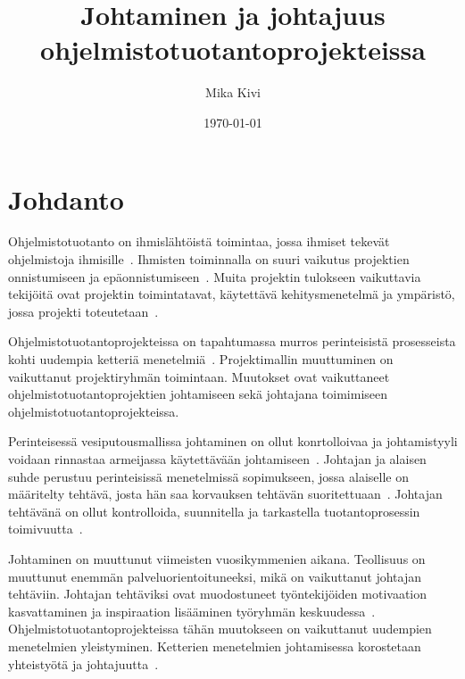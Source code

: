 \documentclass[finnish]{tktltiki2}
\title{Johtaminen ja johtajuus ohjelmistotuotantoprojekteissa}
\author{Mika Kivi}
\date{\today}
\theoremstyle{definition}
\theoremstyle{remark}
\begin{document}

\maketitle        %
\makeabstract     %

\tableofcontents  %
\thispagestyle{empty}
\newpage          %



\setcounter{page}{1}
\section{Johdanto}


Ohjelmistotuotanto on ihmislähtöistä toimintaa, jossa ihmiset tekevät ohjelmistoja ihmisille~\cite{Wang:2010:PPP:1810295.1810302}. Ihmisten toiminnalla on suuri vaikutus projektien onnistumiseen ja epäonnistumiseen~\cite{Wang:2009:PMP:1639950.1640049}. Muita projektin tulokseen vaikuttavia tekijöitä ovat projektin toimintatavat, käytettävä kehitysmenetelmä ja ympäristö, jossa projekti toteutetaan~\cite{McLeod:2011:FAS:1978802.1978803}.

Ohjelmistotuotantoprojekteissa on tapahtumassa murros perinteisistä prosesseista kohti uudempia ketteriä menetelmiä~\cite{Chow2008961}. Projektimallin muuttuminen on vaikuttanut projektiryhmän toimintaan. Muutokset ovat vaikuttaneet ohjelmistotuotantoprojektien johtamiseen sekä johtajana toimimiseen ohjelmistotuotantoprojekteissa.

Perinteisessä vesiputousmallissa johtaminen on ollut konrtolloivaa ja johtamistyyli voidaan rinnastaa armeijassa käytettävään johtamiseen~\cite{Nerur:2005:CMA:1060710.1060712}. Johtajan ja alaisen suhde perustuu perinteisissä menetelmissä sopimukseen, jossa alaiselle on määritelty tehtävä, josta hän saa korvauksen tehtävän suoritettuaan~\cite{thite2000leadership}. Johtajan tehtävänä on ollut kontrolloida, suunnitella ja tarkastella tuotantoprosessin toimivuutta~\cite{palmer2001emotional}.

Johtaminen on muuttunut viimeisten vuosikymmenien aikana. Teollisuus on muuttunut enemmän palveluorientoituneeksi, mikä on vaikuttanut johtajan tehtäviin. Johtajan tehtäviksi ovat muodostuneet työntekijöiden motivaation kasvattaminen ja inspiraation lisääminen työryhmän keskuudessa~\cite{palmer2001emotional}. Ohjelmistotuotantoprojekteissa tähän muutokseen on vaikuttanut uudempien menetelmien yleistyminen. Ketterien menetelmien johtamisessa korostetaan yhteistyötä ja johtajuutta~\cite{Nerur:2005:CMA:1060710.1060712}.
 
\end{document}
